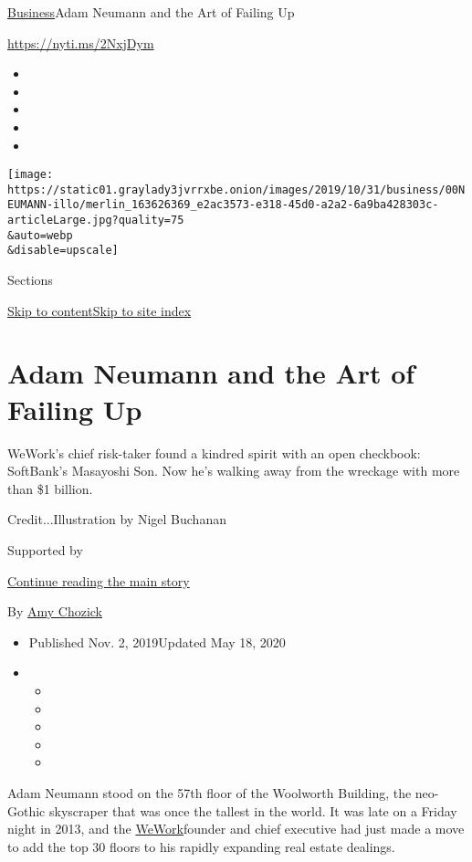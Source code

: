 \href{/section/business}{Business}\textbar{}Adam Neumann and the Art of
Failing Up

\url{https://nyti.ms/2NxjDym}

\begin{itemize}
\item
\item
\item
\item
\item
\end{itemize}

\texttt{[image: https://static01.graylady3jvrrxbe.onion/images/2019/10/31/business/00NEUMANN-illo/merlin\_163626369\_e2ac3573-e318-45d0-a2a2-6a9ba428303c-articleLarge.jpg?quality=75\\\&auto=webp\\\&disable=upscale]}

Sections

\protect\hyperlink{site-content}{Skip to
content}\protect\hyperlink{site-index}{Skip to site index}

\hypertarget{adam-neumann-and-the-art-of-failing-up}{%
\section{Adam Neumann and the Art of Failing
Up}\label{adam-neumann-and-the-art-of-failing-up}}

WeWork's chief risk-taker found a kindred spirit with an open checkbook:
SoftBank's Masayoshi Son. Now he's walking away from the wreckage with
more than \$1 billion.

Credit...Illustration by Nigel Buchanan

Supported by

\protect\hyperlink{after-sponsor}{Continue reading the main story}

By \href{https://www.nytimes3xbfgragh.onion/by/amy-chozick}{Amy Chozick}

\begin{itemize}
\item
  Published Nov. 2, 2019Updated May 18, 2020
\item
  \begin{itemize}
  \item
  \item
  \item
  \item
  \item
  \end{itemize}
\end{itemize}

Adam Neumann stood on the 57th floor of the Woolworth Building, the
neo-Gothic skyscraper that was once the tallest in the world. It was
late on a Friday night in 2013, and the
\href{https://www.nytimes3xbfgragh.onion/2020/05/18/business/wework-rent-coronavirus.html}{WeWork}founder
and chief executive had just made a move to add the top 30 floors to his
rapidly expanding real estate dealings.

